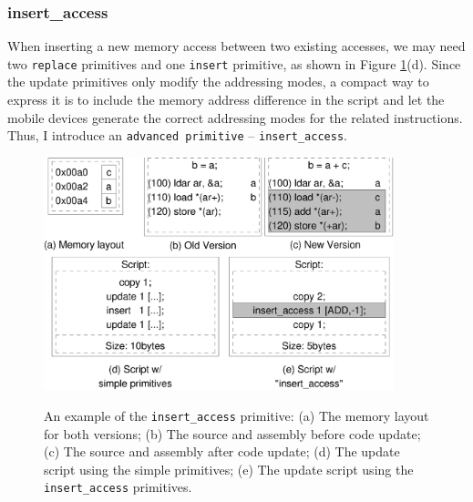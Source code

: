 

\subsubsection{insert\_access}

When inserting a new memory access between two existing accesses, we may need two {\tt replace} primitives and one {\tt insert} primitive, as shown in Figure \ref{insacc}(d). Since the update primitives only modify the addressing modes, a compact way to express it is to include the memory address difference in the script and let the mobile devices generate the correct addressing modes for the related instructions. Thus, I introduce an {\tt advanced primitive} -- {\tt insert\_access}.

\begin{figure}[htbp]
\begin{center}
\includegraphics[width=4in]{./figures/insacc.eps}
\caption[An example of the {\tt insert\_access} primitive.]{An example of the {\tt insert\_access} primitive:
(a) The memory layout for both versions;
(b) The source and assembly before code update;
(c) The  source and assembly after code update;
(d) The update script using the simple primitives;
(e) The update script using the {\tt insert\_access} primitives.
}
\vspace{-0.5in}
\label{insacc}
\end{center}
\end{figure}

